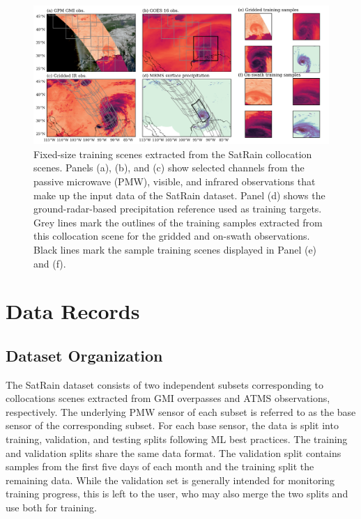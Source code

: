 \documentclass[11pt]{article}
\begin{document}
\begin{figure}[htbp] %
	\centering
	\includegraphics[width=1.0\textwidth]{figures/fig08}
	\caption{
		Fixed-size training scenes extracted from the SatRain collocation
		scenes. Panels (a), (b), and (c) show selected channels from the passive
		microwave (PMW), visible, and infrared observations that make up the
		input data of the SatRain dataset. Panel (d) shows the
		ground-radar-based precipitation reference used as training targets.
		Grey lines mark the outlines of the training samples extracted from this
		collocation scene for the gridded and on-swath observations. Black lines
		mark the sample training scenes displayed in Panel (e) and (f).
	}
	\label{fig:example_scenes}
\end{figure}


\section{Data Records}

\subsection{Dataset Organization}

The SatRain dataset consists of two independent subsets corresponding to collocations scenes extracted from GMI overpasses and ATMS observations, respectively. The underlying PMW sensor of each subset is referred to as the base sensor of the corresponding subset. For each base sensor, the data is split into training, validation, and testing splits following ML best practices. The training and validation splits share the same data format. The validation split contains samples from the first five days of each month and the training split the remaining data. While the validation set is generally intended for monitoring training progress, this is left to the user, who may also merge the two splits and use both for training.
\end{document}
